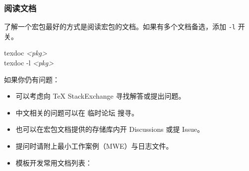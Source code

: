 \begin{frame}
  \frametitle{阅读文档}

  了解一个宏包最好的方式是阅读宏包的文档。如果有多个文档备选，添加 \texttt{-l} 开关。

  \begin{exampleblock}{\faTerminal}
    \ttfamily
    texdoc \textit{<pkg>}\\
    texdoc -l \textit{<pkg>}
  \end{exampleblock}

  如果你仍有问题：
  \begin{itemize}
    \item 可以考虑向 \TeX{} StackExchange  寻找解答或提出问题。
    \item 中文相关的问题可以在 \CTeX{} 临时论坛  搜寻。
    \item 也可以在宏包文档提供的存储库内开 Discussions 或提 Issue。
    \item 提问时请附上最小工作案例（MWE）与日志文件。
    \item 模板开发常用文档列表：
  \end{itemize}

\end{frame}

